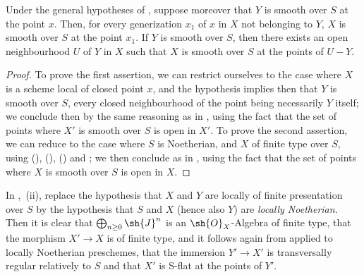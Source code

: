 \begin{corollary}[19.4.9]
\label{IV.19.4.9}
Under the general hypotheses of , suppose moreover that $Y$ is smooth over $S$ at the point $x$.
Then, for every generization $x_1$ of $x$ in $X$ not belonging to $Y$, $X$ is smooth over $S$ at the point $x_1$.
If $Y$ is smooth over $S$, then there exists an open neighbourhood $U$ of $Y$ in $X$ such that $X$ is smooth over $S$ at the points of $U-Y$.
\end{corollary}

\begin{proof}
To prove the first assertion, we can restrict ourselves to the case where $X$ is a scheme local of closed point $x$, and the hypothesis implies then that $Y$ is smooth over $S$, every closed neighbourhood of the point being necessarily $Y$ itself; we conclude then by the same reasoning as in , using the fact that the set of points where $X'$ is smooth over $S$ is open in $X'$.
To prove the second assertion, we can reduce to the case where $S$ is Noetherian, and $X$ of finite type over $S$, using (), (), () and ; we then conclude as in , using the fact that the set of points where $X$ is smooth over $S$ is open in $X$.
\end{proof}

\begin{remark}[19.4.10]
\label{IV.19.4.10}
In ,~(ii), replace the hypothesis that $X$ and $Y$ are locally of finite presentation over $S$ by the hypothesis that $S$ and $X$ (hence also $Y$) are \emph{locally Noetherian}.
Then it is clear that $\bigoplus_{n\geq 0}\sh{J}^n$ is an $\sh{O}_X$-Algebra of finite type, that the morphism $X'\to X$ is of finite type, and it follows again from  applied to locally Noetherian preschemes, that the immersion $Y'\to X'$ is transversally regular relatively to $S$ and that $X'$ is S-flat at the points of $Y'$.
\end{remark}

